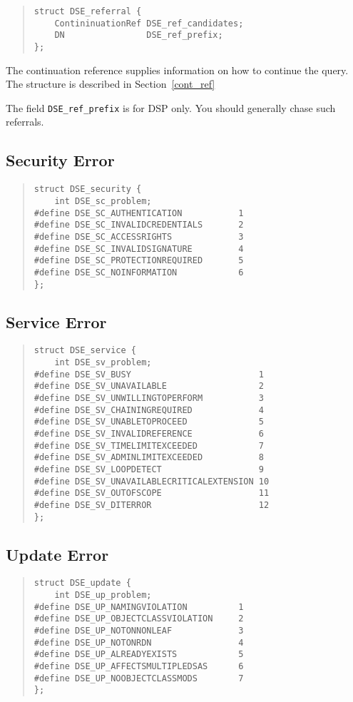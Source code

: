 \begin{quote}\small\begin{verbatim}
struct DSE_referral {
    ContininuationRef DSE_ref_candidates;
    DN                DSE_ref_prefix;
};
\end{verbatim}\end{quote}

The continuation reference supplies information on how to continue the
query.
The structure is described in Section~\ref{cont_ref}

The field \verb"DSE_ref_prefix" is for DSP only.
You should generally chase such referrals.

\subsection{Security Error}
\label{error_sec}
\begin{quote}\small\begin{verbatim}
struct DSE_security {
    int DSE_sc_problem;
#define DSE_SC_AUTHENTICATION           1
#define DSE_SC_INVALIDCREDENTIALS       2
#define DSE_SC_ACCESSRIGHTS             3
#define DSE_SC_INVALIDSIGNATURE         4
#define DSE_SC_PROTECTIONREQUIRED       5
#define DSE_SC_NOINFORMATION            6
};
\end{verbatim}\end{quote}

\subsection{Service Error}
\label{error_ser}
\begin{quote}\small\begin{verbatim}
struct DSE_service {
    int DSE_sv_problem;
#define DSE_SV_BUSY                         1
#define DSE_SV_UNAVAILABLE                  2
#define DSE_SV_UNWILLINGTOPERFORM           3
#define DSE_SV_CHAININGREQUIRED             4
#define DSE_SV_UNABLETOPROCEED              5
#define DSE_SV_INVALIDREFERENCE             6
#define DSE_SV_TIMELIMITEXCEEDED            7
#define DSE_SV_ADMINLIMITEXCEEDED           8
#define DSE_SV_LOOPDETECT                   9
#define DSE_SV_UNAVAILABLECRITICALEXTENSION 10
#define DSE_SV_OUTOFSCOPE                   11
#define DSE_SV_DITERROR                     12
};
\end{verbatim}\end{quote}

\subsection{Update Error}
\begin{quote}\small\begin{verbatim}
struct DSE_update {
    int DSE_up_problem;
#define DSE_UP_NAMINGVIOLATION          1
#define DSE_UP_OBJECTCLASSVIOLATION     2
#define DSE_UP_NOTONNONLEAF             3
#define DSE_UP_NOTONRDN                 4
#define DSE_UP_ALREADYEXISTS            5
#define DSE_UP_AFFECTSMULTIPLEDSAS      6
#define DSE_UP_NOOBJECTCLASSMODS        7
};
\end{verbatim}\end{quote}

